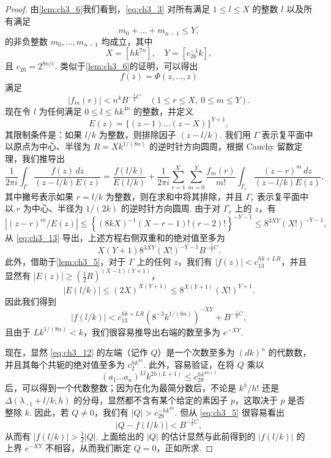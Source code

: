 \begin{proof}
由\autoref{lem:ch3_6}我们看到，\eqref{eq:ch3_3} 对所有满足 $1 \le l \le X$ 的整数 $l$ 以及所有满足
\[
m_0 + \dots + m_{n-1} \le Y,
\]
的非负整数 $m_0, \dots, m_{n-1}$ 均成立，其中
\[
X = [hk^{7n}], \quad Y = [c_{26}^{-1}k],
\]
且 $c_{26} = 2^{8n/\epsilon}$. 类似于\autoref{lem:ch3_6}的证明，可以得出
\[
f(z) = \Phi(z, \dots, z)
\]
满足
\begin{equation} \label{eq:ch3_13}\tag{13}
|f_m(r)| < n^k B^{-\frac{1}{2}C} \quad (1 \le r \le X, \ 0 \le m \le Y).
\end{equation}
现在令 $l$ 为任何满足 $0 \le l \le hk^{4n}$ 的整数，并定义
\[
E(z) = \{(z-1) \dots (z-X)\}^{Y+1},
\]
其限制条件是：如果 $l/k$ 为整数，则排除因子 $(z-l/k)$. 我们用 $\Gamma$ 表示复平面中以原点为中心、半径为 $R = Xk^{1/(8n)}$ 的逆时针方向圆周，根据 Cauchy 留数定理，我们推导出
\[
\frac{1}{2\pi i} \int_{\Gamma} \frac{f(z) \, dz}{(z - l/k) E(z)} = \frac{f(l/k)}{E(l/k)} + \frac{1}{2\pi i} \sum_{r=1}^{X'} \sum_{m=0}^Y \frac{f_m(r)}{m!} \int_{\Gamma_r} \frac{(z - r)^m \, dz}{(z - l/k) E(z)},
\]
其中撇号表示如果 $r=l/k$ 为整数，则在求和中将其排除，并且 $\Gamma_r$ 表示复平面中以 $r$ 为中心、半径为 $1/(2k)$ 的逆时针方向圆周. 由于对 $\Gamma_r$ 上的 $z$，有
\[
\left| (z-r)^m/E(z) \right| \le \left\{ (8kX)^{-1} (X-r-1)! (r-2)! \right\}^{-Y-1} \le 8^{3XY} (X!)^{-Y-1},
\]
从 \eqref{eq:ch3_13} 导出，上述方程右侧双重和的绝对值至多为
\[
X(Y+1) 8^{3XY}(X!)^{-Y-1} B^{-\frac{1}{4}C}.
\]
此外，借助于\autoref{lem:ch3_5}，对于 $\Gamma$ 上的任何 $z$，我们有 $|f(z)| < c_{13}^{hk+LR}$，并且显然有 $|E(z)| \ge (\frac{1}{2}R)^{(X-1)(Y+1)}$，
\[
|E(l/k)| \le (2X)^{X(Y+1)} \le 8^{X(Y+1)}(X!)^{Y+1}.
\]
因此我们得到
\[
|f(l/k)| < c_{13}^{hk+LR} (8^{-3}k^{1/(8n)})^{-XY} + B^{-\frac{1}{2}C},
\]
且由于 $Lk^{1/(8n)} < k$，我们很容易推导出右端的数至多为 $e^{-XY}$.

现在，显然 \eqref{eq:ch3_12} 的左端（记作 $Q$）是一个次数至多为 $(dk)^n$ 的代数数，并且其每个共轭的绝对值至多为 $c_2^{hk^{4n}}$. 此外，容易验证，在将 $Q$ 乘以
\[
(a_1 \dots a_n)^{Ll} k^{2h(L+1)} \le c_{28}^{hk^{4n+1}}
\]
后，可以得到一个代数整数；因为在化为最简分数后，不论是 $k^h/h!$ 还是 $\Delta(\lambda_{-1}+l/k;h)$ 的分母，显然都不含有某个给定的素因子 $p$，这取决于 $p$ 是否整除 $k$. 因此，若 $Q \neq 0$，我们有 $|Q| > c_{29}^{-hk^{4n}}$. 但从 \eqref{eq:ch3_5} 很容易看出
\[
|Q - f(l/k)| < B^{-\frac{1}{2}C},
\]
从而有 $|f(l/k)| > \frac{1}{2}|Q|$. 上面给出的 $|Q|$ 的估计显然与此前得到的 $|f(l/k)|$ 的上界 $e^{-XY}$ 不相容，从而我们断定 $Q = 0$，正如所求.
\end{proof}

